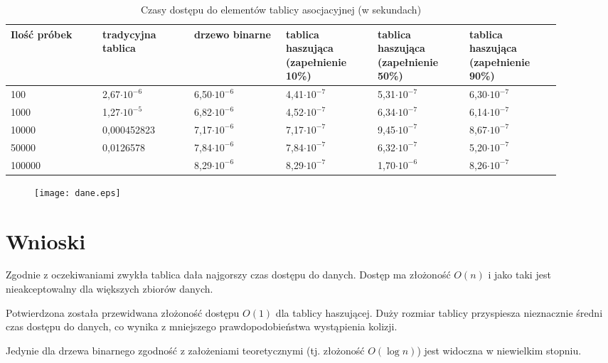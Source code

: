 \documentclass[a4paper,10pt]{article}
\begin{document}
\begin{center}
\begin{table}[!h]

\caption{Czasy dostępu do elementów tablicy asocjacyjnej (w sekundach)}

\begin{tabular}{p{0.15\linewidth}|p{0.15\linewidth}|p{0.15\linewidth}|p{0.15\linewidth}|p{0.15\linewidth}|p{0.15\linewidth}}
\textbf{Ilość próbek} & \textbf{tradycyjna tablica} & \textbf{drzewo binarne} & \textbf{tablica haszująca (zapełnienie 10\%)} & \textbf{tablica haszująca (zapełnienie 50\%)} & \textbf{tablica haszująca (zapełnienie 90\%)}\\
\hline	
100 & 2,67\(\cdot 10^{-6}\) & 6,50\(\cdot 10^{-6}\) & 4,41\(\cdot 10^{-7}\) & 5,31\(\cdot 10^{-7}\) & 6,30\(\cdot 10^{-7}\)\\
1000 & 1,27\(\cdot 10^{-5}\) & 6,82\(\cdot 10^{-6}\) & 4,52\(\cdot 10^{-7}\) & 6,34\(\cdot 10^{-7}\) & 6,14\(\cdot 10^{-7}\)\\
10000 & 0,000452823 & 7,17\(\cdot 10^{-6}\) & 7,17\(\cdot 10^{-7}\) & 9,45\(\cdot 10^{-7}\) & 8,67\(\cdot 10^{-7}\)\\
50000 & 0,0126578 & 7,84\(\cdot 10^{-6}\) & 7,84\(\cdot 10^{-7}\) & 6,32\(\cdot 10^{-7}\) & 5,20\(\cdot 10^{-7}\)\\
100000 &  & 8,29\(\cdot 10^{-6}\) & 8,29\(\cdot 10^{-7}\) & 1,70\(\cdot 10^{-6}\) & 8,26\(\cdot 10^{-7}\)
\end{tabular}
\end{table}

\end{center}

\begin{figure}[!h]
\texttt{[image: dane.eps]}
 
\end{figure}

\section{Wnioski}

\par Zgodnie z oczekiwaniami zwykła tablica dała najgorszy czas dostępu do danych.
Dostęp ma złożoność \(O(n)\) i jako taki jest nieakceptowalny dla większych 
zbiorów danych.

\par Potwierdzona została przewidwana złożoność dostępu \(O(1)\) dla tablicy
haszującej. Duży rozmiar tablicy przyspiesza nieznacznie średni czas dostępu do
danych, co wynika z mniejszego prawdopodobieństwa wystąpienia kolizji.

\par Jedynie dla drzewa binarnego zgodność z założeniami teoretycznymi (tj.
złożoność \(O(\log n)\)) jest widoczna w niewielkim stopniu.
\end{document}
